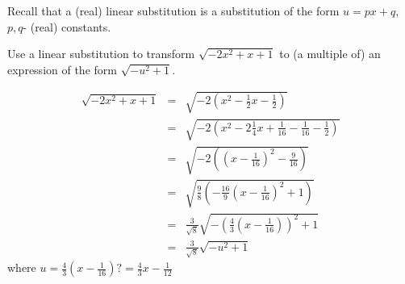 \begin{frame}
Recall that a (real) linear substitution is a substitution of the form $u=px+q$, $p,q$- (real) constants.
\begin{example}
Use a linear substitution to transform $\sqrt{-2x^2+x+1}$ to (a multiple of) an expression of the form $\sqrt{-u^2+1}$. 

\[
\begin{array}{rcl}
\sqrt{-2x^2+x+1}&=&\sqrt{ -2\left(x^2-\frac{1}{2}x -\frac{1}{2}\right) } \\
&=& \sqrt{ -2\left(x^2-2\frac{1}{4}x +\frac{1}{16}-\frac{1}{16}-\frac{1}{2}\right) }\\
&=&\sqrt{-2\left(\left(x-\frac{1}{16}\right)^2-\frac{9}{16} \right)}\\
&=&\sqrt{\frac{9}{8}\left(-\frac{16}{9}\left(x-\frac{1}{16}\right)^2+1 \right)}\\
&=&\frac{3}{\sqrt{8}}\sqrt{-\left(\frac{4}{3}\left(x-\frac{1}{16}\right)\right)^2+1 }\\
&=&\frac{ 3}{\sqrt{8}} \sqrt{-u^2+1}
\end{array}
\]
where $u=\frac{4}{3}\left(x-\frac{1}{16}\right)  \textbf{?}=\frac{4}{3}x-\frac{1}{12}$
\end{example}
\end{frame}
